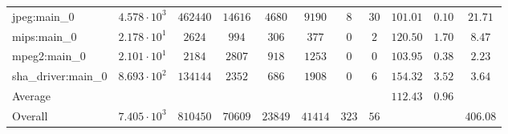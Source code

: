 \begin{tabular}{|l|c|c|c|c|c|c|c|c|c|c|}
jpeg:main\_0            & $ 4.578 \cdot 10^{3}  $ & $ 462440 $ & $ 14616 $ & $ 4680  $ & $ 9190  $ & $ 8   $ & $ 30 $ & $ 101.01      $ & $ 0.10    $ & $ 21.71   $ \\
mips:main\_0            & $ 2.178 \cdot 10^{1}  $ & $ 2624   $ & $ 994   $ & $ 306   $ & $ 377   $ & $ 0   $ & $ 2  $ & $ 120.50      $ & $ 1.70    $ & $ 8.47    $ \\
mpeg2:main\_0           & $ 2.101 \cdot 10^{1}  $ & $ 2184   $ & $ 2807  $ & $ 918   $ & $ 1253  $ & $ 0   $ & $ 0  $ & $ 103.95      $ & $ 0.38    $ & $ 2.23    $ \\
sha\_driver:main\_0     & $ 8.693 \cdot 10^{2}  $ & $ 134144 $ & $ 2352  $ & $ 686   $ & $ 1908  $ & $ 0   $ & $ 6  $ & $ 154.32      $ & $ 3.52    $ & $ 3.64    $ \\
\hline
Average                 & $                     $ & $        $ & $       $ & $       $ & $       $ & $     $ & $    $ & $ 112.43      $ & $ 0.96    $ & $         $ \\
\hline
Overall                 & $ 7.405 \cdot 10^{3}  $ & $ 810450 $ & $ 70609 $ & $ 23849 $ & $ 41414 $ & $ 323 $ & $ 56 $ & $             $ & $         $ & $ 406.08  $ \\
\hline
\end{tabular}
